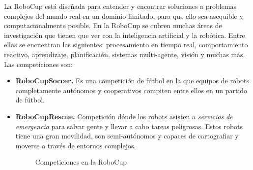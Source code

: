La RoboCup está diseñada para entender y encontrar soluciones a problemas complejos del mundo real en un dominio limitado, para que ello sea asequible y computacionalmente posible. En la RoboCup se cubren muchas áreas de investigación que tienen que ver con la inteligencia artificial y la robótica. Entre ellas se encuentran las siguientes: procesamiento en tiempo real, comportamiento reactivo, aprendizaje, planificación, sistemas multi-agente, visión y muchas más. Las competiciones son: \\

\begin{itemize}

\item \textbf{RoboCupSoccer.} Es una competición de fútbol en la que equipos de robots completamente autónomos y cooperativos compiten entre ellos en un partido de fútbol.

\item \textbf{RoboCupRescue.} Competición dónde los robots asisten a \textit{servicios de emergencia} para salvar gente y llevar a cabo tareas peligrosas. Estos robots tiene una gran movilidad, son semi-autónomos y capaces de cartografiar y moverse a través de entornos complejos.

\begin{figure}[h]
  \centering
\caption{Competiciones en la RoboCup}
\end{figure}


\end{itemize}
